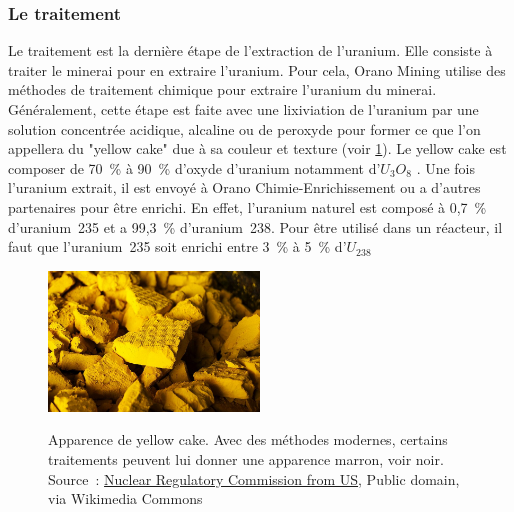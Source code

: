 \subsubsection{Le traitement}
Le traitement est la dernière étape de l'extraction de l'uranium. Elle consiste à traiter le minerai pour en extraire l'uranium. Pour cela, Orano Mining utilise des méthodes de traitement chimique pour extraire l'uranium du minerai. Généralement, cette étape est faite avec une lixiviation de l'uranium par une solution concentrée acidique, alcaline ou de peroxyde pour former ce que l'on appellera du "yellow cake" due à sa couleur et texture (voir \cref{fig_yellow-cake}). Le yellow cake est composer de 70~\% à 90~\% d'oxyde d'uranium notamment d'$U_3O_8$ \cite{article:composition-yellow-cake}. Une fois l'uranium extrait, il est envoyé à Orano Chimie-Enrichissement ou a d'autres partenaires pour être enrichi. En effet, l'uranium naturel est composé à 0,7~\% d'uranium~235 et a 99,3~\% d'uranium~238\cite{}. Pour être utilisé dans un réacteur, il faut que l'uranium~235 soit enrichi entre 3~\% à 5~\% d'$U_{238}$\cite{article:uranium-concentration}

\begin{figure}
\centering
\href{https://commons.wikimedia.org/wiki/File:Yellow_Cake_Uranium_(14492248719).jpg}{\includegraphics[width=0.5\textwidth]{img/Yellow_Cake_Uranium_(14492248719).jpg}}
\caption[Apparence du yellow cake]{Apparence de yellow cake. Avec des méthodes modernes, certains traitements peuvent lui donner une apparence marron, voir noir. Source~: \href{https://commons.wikimedia.org/wiki/File:Yellow_Cake_Uranium_(14492248719).jpg}{Nuclear Regulatory Commission from US}, Public domain, via Wikimedia Commons}
\label{fig_yellow-cake}
\end{figure}

